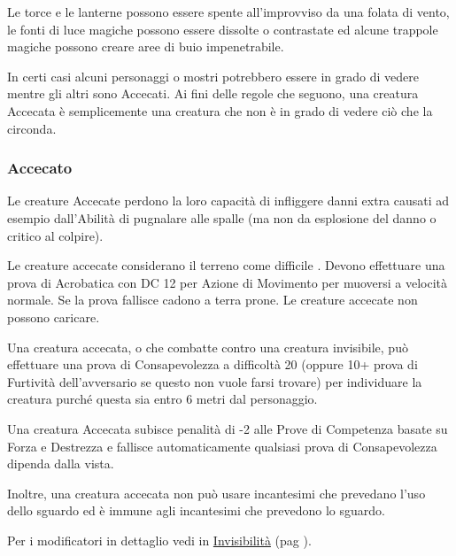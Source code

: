 \begin{multicols}{2}
Le torce e le lanterne possono essere spente all'improvviso da una folata di vento, le fonti di luce magiche possono essere dissolte o contrastate ed alcune trappole magiche possono creare aree di buio impenetrabile.

In certi casi alcuni personaggi o mostri potrebbero essere in grado di vedere mentre gli altri sono Accecati. Ai fini delle regole che seguono, una creatura Accecata è semplicemente una creatura che non è in grado di vedere ciò che la circonda.

\subsubsection{Accecato}

\label{accecato}

Le creature Accecate perdono la loro capacità di infliggere danni extra causati ad esempio dall'Abilità di pugnalare alle spalle (ma non da esplosione del danno o critico al colpire).

Le creature accecate considerano il terreno come difficile . Devono effettuare una prova di Acrobatica con DC 12 per Azione di Movimento per muoversi a velocità normale. Se la prova fallisce cadono a terra prone. Le creature accecate non possono caricare.

Una creatura accecata, o che combatte contro una creatura invisibile, può effettuare una prova di Consapevolezza a difficoltà 20 (oppure 10+ prova di Furtività dell'avversario se questo non vuole farsi trovare) per individuare la creatura purché questa sia entro 6 metri dal personaggio.

Una creatura Accecata subisce penalità di -2 alle Prove di Competenza basate su Forza e Destrezza e fallisce automaticamente qualsiasi prova di Consapevolezza dipenda dalla vista.

Inoltre, una creatura accecata non può usare incantesimi che prevedano l'uso dello sguardo ed è immune agli incantesimi che prevedono lo sguardo.

Per i modificatori in dettaglio vedi in \hyperlink{invisibilita}{Invisibilità} (pag \pageref{invisibilita}).


\end{multicols}
